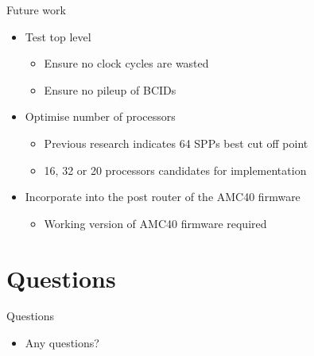 \documentclass{beamer}
\begin{document}
\begin{frame}{Future work}
  \begin{itemize}
    \item
    Test top level
    \begin{itemize}
      \item Ensure no clock cycles are wasted
      \item Ensure no pileup of BCIDs
    \end{itemize}
    \item
      Optimise number of processors
      \begin{itemize}
        \item
          Previous research indicates 64 SPPs best cut off point
        \item
          16, 32 or 20 processors candidates for implementation
      \end{itemize}
    \item
      Incorporate into the post router of the AMC40 firmware
      \begin{itemize}
        \item Working version of AMC40 firmware required
      \end{itemize}
  \end{itemize}
\end{frame}

\section*{Questions}
\begin{frame}{Questions}
  \begin{itemize}
    \item Any questions?
  \end{itemize}
\end{frame}
\end{document}
